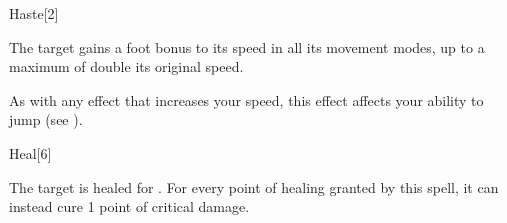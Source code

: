 \begin{spellsection}{Haste}[2]
    \begin{spellheader}
    \end{spellheader}
    \begin{spellcontent}
        \begin{spelltargetinginfo}
        \end{spelltargetinginfo}
        \begin{spelleffects}
            \spelleffect The target gains a  foot bonus to its speed in all its movement modes, up to a maximum of double its original speed.
            \spelldur \durshort \dismissable
        \end{spelleffects}
    \end{spellcontent}
    \begin{spellfooter}
        \spellnotes As with any effect that increases your speed, this effect affects your ability to jump (see ).
        \miscastrandom
    \end{spellfooter}
    \begin{spellaugments}
    \end{spellaugments}
\end{spellsection}

\begin{spellsection}{Heal}[6]
    \begin{spellheader}
    \end{spellheader}
    \begin{spellcontent}
        \begin{spelltargetinginfo}
        \end{spelltargetinginfo}
        \begin{spelleffects}
            \spelleffect The target is healed for \spelldamage{}.
            For every point of healing granted by this spell, it can instead cure 1 point of critical damage.
        \end{spelleffects}
    \end{spellcontent}
    \begin{spellfooter}
        \miscastrandom
    \end{spellfooter}
    \begin{spellaugments}
    \end{spellaugments}
\end{spellsection}

